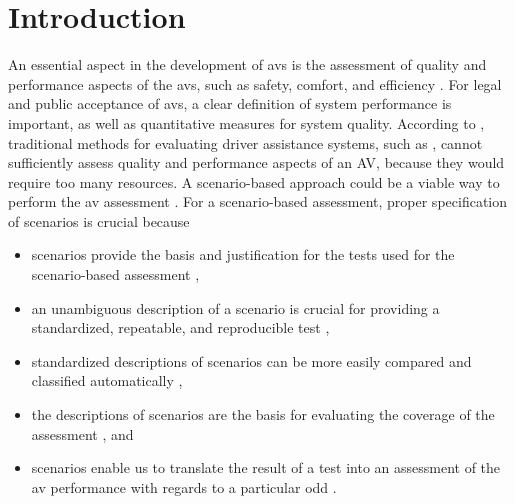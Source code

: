 \section{Introduction}
\label{sec:introduction}

An essential aspect in the development of \acp{av} is the assessment of quality and performance aspects of the \acp{av}, such as safety, comfort, and efficiency \autocite{bengler2014threedecades, wachenfeld2016release, Helmer2017safety, stellet2015taxonomy, gietelink2006development, putz2017pegasus, roesener2017comprehensive, riedmaier2020survey}.
For legal and public acceptance of \acp{av}, a clear definition of system performance is important, as well as quantitative measures for system quality. 
According to \autocite{wachenfeld2016release}, traditional methods for evaluating driver assistance systems, such as \autocite{response2006code, ISO26262}, cannot sufficiently assess quality and performance aspects of an AV, because they would require too many resources. 
\cstartc A scenario-based approach could be a viable way to perform the \ac{av} assessment \autocite{putz2017pegasus, elrofai2018scenario, riedmaier2020survey}. 
For a scenario-based assessment, proper specification of scenarios is crucial because 
\begin{itemize}
	\item scenarios \cendc\cstartd provide the basis and justification for \cendd\cstartc the tests used for the scenario-based assessment \autocite{stellet2015taxonomy, aparicio2013pre, ulbrich2015, geyer2014, putz2017pegasus, zofka2015datadrivetrafficscenarios},
	\item an unambiguous description of a scenario is crucial for providing a standardized, repeatable, and reproducible test \autocite{aparicio2013pre},
	\item standardized descriptions of scenarios can be more easily compared and classified \cendc\cstartd automatically \cendd\cstartc\autocite{degelder2019scenariocategories},
	\item the descriptions of scenarios are the basis for evaluating the coverage of the assessment \autocite{putz2017pegasus}, and
	\item scenarios enable us to translate the result of a test into an assessment of the \ac{av} performance with regards to a particular \ac{odd} \autocite{weber2019framework, gyllenhammar2020towards}.
\end{itemize}

